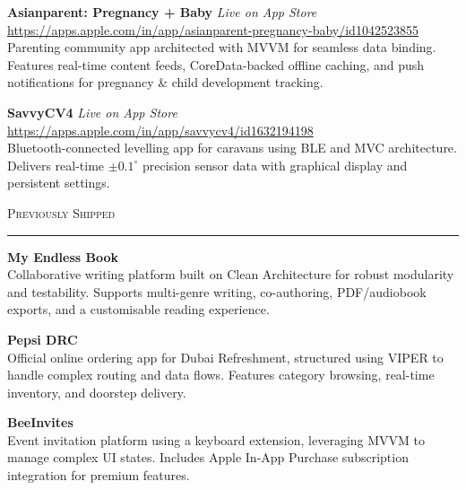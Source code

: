 
\noindent
{\color{highlight} \textbf{\large Asianparent: Pregnancy + Baby}} \hfill \textit{\small Live on App Store} \\
\url{https://apps.apple.com/in/app/asianparent-pregnancy-baby/id1042523855} \\
Parenting community app architected with MVVM for seamless data binding. Features real-time content feeds, CoreData-backed offline caching, and push notifications for pregnancy \& child development tracking.
\vspace{1em}

\noindent
{\color{highlight} \textbf{\large SavvyCV4}} \hfill \textit{\small Live on App Store} \\
\url{https://apps.apple.com/in/app/savvycv4/id1632194198} \\
Bluetooth-connected levelling app for caravans using BLE and MVC architecture. Delivers real-time $\pm 0.1^{\circ}$ precision sensor data with graphical display and persistent settings.
\vspace{1.5em}

\noindent
{\color{highlight} \scshape \large Previously Shipped} \par
\vspace{0.3em}
\hrule
\vspace{0.8em}

\noindent
{\color{highlight} \textbf{\large My Endless Book}} \\
Collaborative writing platform built on Clean Architecture for robust modularity and testability. Supports multi-genre writing, co-authoring, PDF/audiobook exports, and a customisable reading experience.
\vspace{1em}

\noindent
{\color{highlight} \textbf{\large Pepsi DRC}} \\
Official online ordering app for Dubai Refreshment, structured using VIPER to handle complex routing and data flows. Features category browsing, real-time inventory, and doorstep delivery.
\vspace{1em}

\noindent
{\color{highlight} \textbf{\large BeeInvites}} \\
Event invitation platform using a keyboard extension, leveraging MVVM to manage complex UI states. Includes Apple In-App Purchase subscription integration for premium features.
